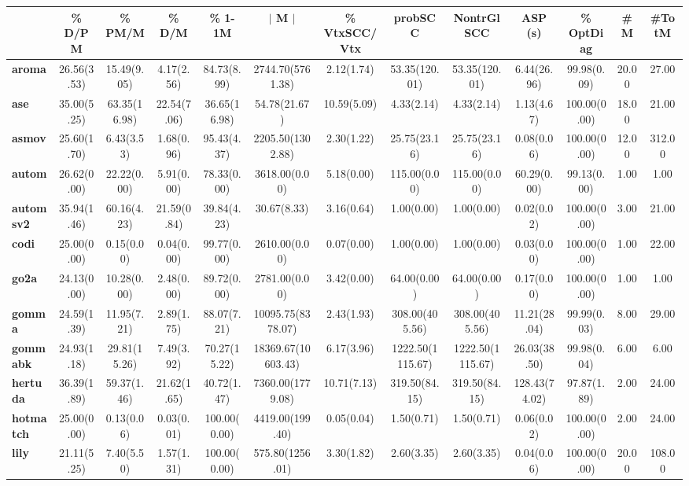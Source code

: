 \begin{tabular}{|l|c|c|c|c|c|c|c|c|c|c|c|c|}
\hline
&\textbf{\% D/PM}&\textbf{\% PM/M}&\textbf{\% D/M}&\textbf{\% 1-1M}&\textbf{$\vert$ M $\vert$}&\textbf{\% VtxSCC/Vtx}&\textbf{probSCC}&\textbf{NontrGlSCC}&\textbf{ASP (s)}&\textbf{\% OptDiag}&\textbf{\#M}&\textbf{\#TotM}\\\hline
\textbf{aroma}&26.56(3.53)&15.49(9.05)&4.17(2.56)&84.73(8.99)&2744.70(5761.38)&2.12(1.74)&53.35(120.01)&53.35(120.01)&6.44(26.96)&99.98(0.09)&20.00&27.00\\\hline
\textbf{ase}&35.00(5.25)&63.35(16.98)&22.54(7.06)&36.65(16.98)&54.78(21.67)&10.59(5.09)&4.33(2.14)&4.33(2.14)&1.13(4.67)&100.00(0.00)&18.00&21.00\\\hline
\textbf{asmov}&25.60(1.70)&6.43(3.53)&1.68(0.96)&95.43(4.37)&2205.50(1302.88)&2.30(1.22)&25.75(23.16)&25.75(23.16)&0.08(0.06)&100.00(0.00)&12.00&312.00\\\hline
\textbf{autom}&26.62(0.00)&22.22(0.00)&5.91(0.00)&78.33(0.00)&3618.00(0.00)&5.18(0.00)&115.00(0.00)&115.00(0.00)&60.29(0.00)&99.13(0.00)&1.00&1.00\\\hline
\textbf{automsv2}&35.94(1.46)&60.16(4.23)&21.59(0.84)&39.84(4.23)&30.67(8.33)&3.16(0.64)&1.00(0.00)&1.00(0.00)&0.02(0.02)&100.00(0.00)&3.00&21.00\\\hline
\textbf{codi}&25.00(0.00)&0.15(0.00)&0.04(0.00)&99.77(0.00)&2610.00(0.00)&0.07(0.00)&1.00(0.00)&1.00(0.00)&0.03(0.00)&100.00(0.00)&1.00&22.00\\\hline
\textbf{go2a}&24.13(0.00)&10.28(0.00)&2.48(0.00)&89.72(0.00)&2781.00(0.00)&3.42(0.00)&64.00(0.00)&64.00(0.00)&0.17(0.00)&100.00(0.00)&1.00&1.00\\\hline
\textbf{gomma}&24.59(1.39)&11.95(7.21)&2.89(1.75)&88.07(7.21)&10095.75(8378.07)&2.43(1.93)&308.00(405.56)&308.00(405.56)&11.21(28.04)&99.99(0.03)&8.00&29.00\\\hline
\textbf{gommabk}&24.93(1.18)&29.81(15.26)&7.49(3.92)&70.27(15.22)&18369.67(10603.43)&6.17(3.96)&1222.50(1115.67)&1222.50(1115.67)&26.03(38.50)&99.98(0.04)&6.00&6.00\\\hline
\textbf{hertuda}&36.39(1.89)&59.37(1.46)&21.62(1.65)&40.72(1.47)&7360.00(1779.08)&10.71(7.13)&319.50(84.15)&319.50(84.15)&128.43(74.02)&97.87(1.89)&2.00&24.00\\\hline
\textbf{hotmatch}&25.00(0.00)&0.13(0.06)&0.03(0.01)&100.00(0.00)&4419.00(199.40)&0.05(0.04)&1.50(0.71)&1.50(0.71)&0.06(0.02)&100.00(0.00)&2.00&24.00\\\hline
\textbf{lily}&21.11(5.25)&7.40(5.50)&1.57(1.31)&100.00(0.00)&575.80(1256.01)&3.30(1.82)&2.60(3.35)&2.60(3.35)&0.04(0.06)&100.00(0.00)&20.00&108.00\\\hline

\end{tabular}
